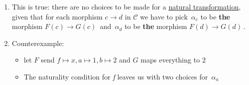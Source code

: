 \begin{enumerate}
    \item   This is true: there are no choices to be made for a \href{doc/1 math/Seven Sketches in Compositionality/Chapter 3: Databases/3 Functors, natural transformations, and databases/4 Natural transformations/1 Natural transformation}{natural transformation}, given that for each morphism $c\rightarrow d$ in $\mathcal{C}$ we have to pick \,$\alpha_c$ to be \textbf{the} morphism $F(c)\rightarrow G(c)$\, and \,$\alpha_{d}$ to be \textbf{the} morphism $F(d)\rightarrow G(d)$\,.
    \item Counterexample: 
          \begin{itemize}
            \item let $F$ send $f\mapsto x,a\mapsto1,b\mapsto 2$ and $G$ maps everything to $2$
            \item The naturality condition for \emph{f} leaves us with two choices for \,$\alpha_a$

                  \,
          \end{itemize}

  \end{enumerate}
